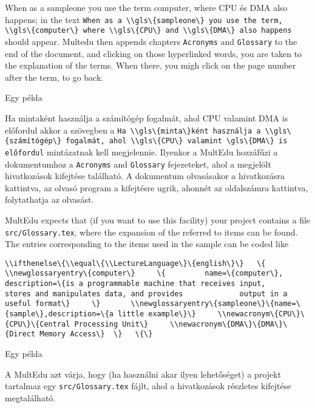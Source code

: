 {

When as a \gls{sampleone} you use the term \gls{computer},
where \gls{CPU} és \gls{DMA} also happens;
in the text \lstinline|When as a \\gls\{sampleone\} you use the term, \\gls\{computer\} where \\gls\{CPU\} and \\gls\{DMA\} also happens| should appear. Multedu then appends chapters \lstinline|Acronyms| and \lstinline|Glossary| to the end of the document, and clicking on those hyperlinked words, you are taken
to the explanation of the terms. When there, you migh click on the page number after the term, to go back.


}
{Egy példa}
{

Ha \gls{minta}ként használja a \gls{számítógép} fogalmát,
ahol \gls{CPU} valamint \gls{DMA} is előfordul
akkor a szövegben a \lstinline|Ha \\gls\{minta\}ként használja a \\gls\{számítógép\} fogalmát, ahol \\gls\{CPU\} valamint \gls\{DMA\} is előfordul| mintázatnak kell megjelennie.
Ilyenkor a MultEdu hozzáfűzi a dokumentumhoz a \lstinline|Acronyms| and \lstinline|Glossary| fejezeteket, ahol a megjelölt hivatkozások kifejtése 
található. A dokumentum olvasásakor a hivatkozásra kattintva, az olvasó 
program a kifejtésre ugrik, ahonnét az oldalszámra kattintva, folytathatja
az olvasást.

}




{
MultEdu expects that (if you want to use this facility) your project
contains a file \lstinline|src/Glossary.tex|, where the expansion
of the referred to items can be found. The entries corresponding 
to the items used in the sample can be coded like

\lstinline|\\ifthenelse\{\\equal\{\\LectureLanguage\}\{english\}\}
  \{
	\\newglossaryentry\{computer\}
	\{
		name=\{computer\},
		description=\{is a programmable machine that receives input,
			stores and manipulates data, and provides
			output in a useful format\}
	\}	
	\\newglossaryentry\{sampleone\}\{name=\{sample\},description=\{a little example\}\}
    \\newacronym\{CPU\}\{CPU\}\{Central Processing Unit\}
    \\newacronym\{DMA\}\{DMA\}\{Direct Memory Access\}
 \}	
 \{\}|

}
{Egy példa}
{
A MultEdu azt várja, hogy (ha használni akar ilyen lehetőséget) a projekt
tartalmaz egy \lstinline|src/Glossary.tex| fájlt,
ahol a hivatkozások részletes kifejtése megtalálható.

}


